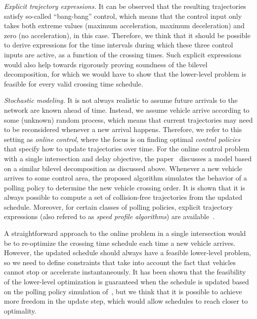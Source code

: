 \documentclass[notitlepage]{report}
\begin{document}
\vspace{0.5em}\noindent
\textit{Explicit trajectory expressions.}
It can be observed that the resulting trajectories satisfy so-called
``bang-bang'' control, which means that the control input only takes both
extreme values (maximum acceleration, maximum deceleration) and zero (no
acceleration), in this case. Therefore, we think that it should be possible to
derive expressions for the time intervals during which these three control
inputs are active, as a function of the crossing times.
%
Such explicit expressions would also help towards rigorously proving soundness
of the bilevel decomposition, for which we would have to show that the
lower-level problem is feasible for every valid crossing time schedule.

\vspace{0.5em}\noindent
\textit{Stochastic modeling.}
It is not always realistic to assume future arrivals to the network are known
ahead of time. Instead, we assume vehicle arrive according to some (unknown)
random process, which means that current trajectories may need to be
reconsidered whenever a new arrival happens. Therefore, we refer to this setting
as \textit{online control}, where the focus is on finding optimal \textit{control policies} that
specify how to update trajectories over time.
%
For the online control problem with a single intersection and delay objective,
the paper~\cite{miculescuPollingsystemsbasedAutonomousVehicle2016} discusses a
model based on a similar bilevel decomposition as discussed above. Whenever a
new vehicle arrives to some control area, the proposed algorithm simulates the
behavior of a polling policy to determine the new vehicle crossing order. It is
shown that it is always possible to compute a set of collision-free trajectories
from the updated schedule. Moreover, for certain classes of polling policies,
explicit trajectory expressions (also refered to as \textit{speed profile
  algorithms}) are available~\cite{timmermanPlatoonFormingAlgorithms2021}.


A straightforward approach to the online problem in a single intersection would
be to re-optimize the crossing time schedule each time a new vehicle arrives.
However, the updated schedule should always have a feasible lower-level problem,
so we need to define constraints that take into account the fact that vehicles
cannot stop or accelerate instantaneously. It has been shown that the
feasibility of the lower-level optimization is guaranteed when the schedule is
updated based on the polling policy simulation
of~\cite{miculescuPollingsystemsbasedAutonomousVehicle2016}, but we think that
it is possible to achieve more freedom in the update step, which would allow
schedules to reach closer to optimality.




\end{document}
